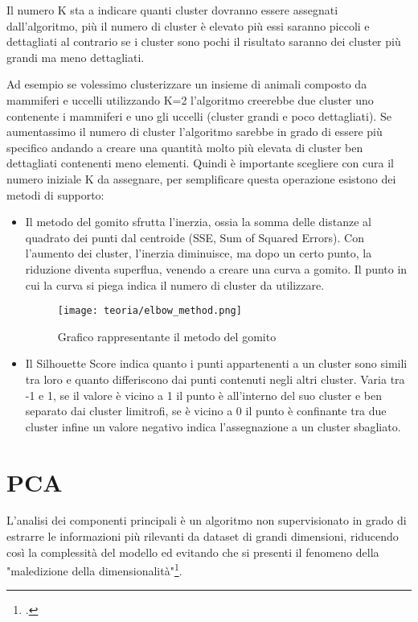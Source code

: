 Il numero K sta a indicare quanti cluster dovranno essere assegnati dall'algoritmo, più il numero di cluster è elevato più essi saranno piccoli e dettagliati al contrario se i cluster sono pochi il risultato saranno dei cluster più grandi ma meno dettagliati.

Ad esempio se volessimo clusterizzare un insieme di animali composto da mammiferi e uccelli utilizzando K=2 l'algoritmo creerebbe due cluster uno contenente i mammiferi e uno gli uccelli (cluster grandi e poco dettagliati).
Se aumentassimo il numero di cluster l'algoritmo sarebbe in grado di essere più specifico andando a creare una quantità molto più elevata di cluster ben dettagliati contenenti meno elementi.
Quindi è importante scegliere con cura il numero iniziale K da assegnare, per semplificare questa operazione esistono dei metodi di supporto:
\begin{itemize}
    \item Il metodo del gomito sfrutta l’inerzia, ossia la somma delle distanze al quadrato dei punti dal centroide (SSE, Sum of Squared Errors). Con l'aumento dei cluster, l’inerzia diminuisce, ma dopo un certo punto, la riduzione diventa superflua, venendo a creare una curva a gomito. Il punto in cui la curva si piega indica il numero di cluster da utilizzare.
    
    \begin{figure}[!h] 
        \centering 
        \texttt{[image: teoria/elbow\_method.png]} 
        \caption{Grafico rappresentante il metodo del gomito}
        \label{fig:gomito}
      \end{figure}

    \item Il Silhouette Score indica quanto i punti appartenenti a un cluster sono simili tra loro e quanto differiscono dai punti contenuti negli altri cluster.
    Varia tra -1 e 1, se il valore è vicino a 1 il punto è all'interno del suo cluster e ben separato dai cluster limitrofi, se è vicino a 0 il punto è confinante tra due cluster infine un valore negativo indica l'assegnazione a un cluster sbagliato.
\end{itemize}


\section{PCA}
L'analisi dei componenti principali è un algoritmo non supervisionato in grado di estrarre le informazioni più rilevanti da dataset di grandi dimensioni, riducendo così la complessità del modello ed evitando che si presenti il fenomeno della "maledizione della dimensionalità"\footcite{site:PCA}.


